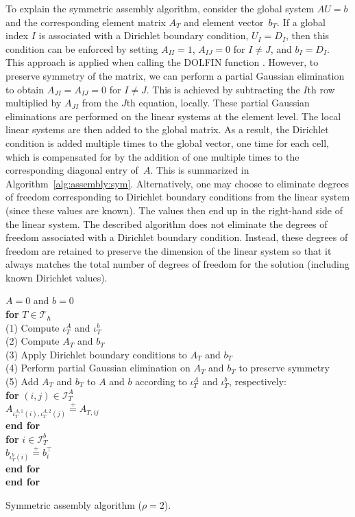 To explain the symmetric assembly algorithm, consider the global
system $AU=b$ and the corresponding element matrix $A_T$ and element
vector~$b_T$. If a global index $I$ is associated with a Dirichlet
boundary condition, $U_I=D_I$, then this condition can be enforced by
setting $A_{II} = 1$, $A_{IJ} = 0$ for $I \neq J$, and $b_I =
D_I$. This approach is applied when calling the DOLFIN function
. However, to preserve symmetry of the matrix,
we can perform a partial Gaussian elimination to obtain $A_{JI} =
A_{IJ} = 0$ for $I \ne J$. This is achieved by subtracting the $I$th
row multiplied by $A_{JI}$ from the $J$th equation, locally. These
partial Gaussian eliminations are performed on the linear systems at
the element level. The local linear systems are then added to the
global matrix. As a result, the Dirichlet condition is added multiple
times to the global vector, one time for each cell, which is
compensated for by the addition of one multiple times to the
corresponding diagonal entry of~$A$. This is summarized in
Algorithm~\ref{alg:assembly:sym}. Alternatively, one may choose to
eliminate degrees of freedom corresponding to Dirichlet boundary
conditions from the linear system (since these values are known). The
values then end up in the right-hand side of the linear system. The
described algorithm does not eliminate the degrees of freedom
associated with a Dirichlet boundary condition. Instead, these degrees
of freedom are retained to preserve the dimension of the linear system
so that it always matches the total number of degrees of freedom for
the solution (including known Dirichlet values).

\begin{algorithm}
  \begin{tabbing}
    $A = 0$ and $b = 0$\\
    \textbf{for}  {$T \in \mathcal{T}_h$}\\
    \tab (1) Compute $\iota^A_T$ and $\iota^b_T$  \\
    \tab (2) Compute $A_T$ and $b_T$ \\
    \tab (3) Apply Dirichlet boundary conditions to $A_T$ and $b_T$ \\
    \tab (4) Perform partial Gaussian elimination on $A_T$ and $b_T$ to preserve symmetry \\
    \tab (5) Add $A_T$ and $b_T$ to $A$ and $b$ according to $\iota^A_T$ and $\iota^b_T$, respectively: \\
    \tab \textbf{for} $(i,j) \in \mathcal{I}^A_T$ \\
    \tab \tab $A_{\iota^{A,1}_T(i), \iota^{A,2}_T(j)} \stackrel{+}{=} A_{T,ij}$ \\
    \tab \textbf{end for} \\
    \tab \textbf{for} $i \in \mathcal{I}^b_T$  \\
    \tab \tab $b_{\iota^b_T(i)} \stackrel{+}{=} b^{\top}_i$  \\
    \tab \textbf{end for} \\
    \textbf{end for}
  \end{tabbing}
  \caption{Symmetric assembly algorithm ($\rho = 2$).}
  \label{alg:assembly:sym}
\end{algorithm}

